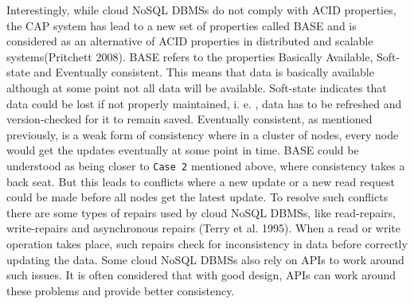 Interestingly,   while cloud \ac{NoSQL} \acp{DBMS} do not comply with ACID
properties,   the CAP system has lead to a new set of properties called BASE and
is considered as an alternative of ACID properties in distributed and scalable
systems(Pritchett 2008). 
BASE refers to the properties Basically Available,   Soft-state and Eventually
consistent.  This means that data is basically available although at some point
not all data will be available.  Soft-state indicates that data could be lost if
not properly maintained,   i. e. ,   data has to be refreshed and version-checked for
it to remain saved.  Eventually consistent,   as mentioned previously,   is a weak
form of consistency where in a cluster of nodes,   every node would get the
updates eventually at some point in time. 
BASE could be understood as being closer to  \texttt{Case 2} mentioned above,  
where consistency takes a back seat.  But this leads to conflicts where a new update or a new read
request could be made before all nodes get the latest update.  To resolve such
conflicts there are some types of repairs used by cloud \ac{NoSQL} \acp{DBMS},  
like read-repairs,   write-repairs and asynchronous repairs (Terry et al.  1995). 
When a read or write operation takes place,   such repairs check for inconsistency
in data before correctly updating the data.  Some cloud \ac{NoSQL} \acp{DBMS} also rely
on APIs to work around such issues.  It is often considered that with good
design,   \acp{API} can work around these problems and provide better consistency. 

